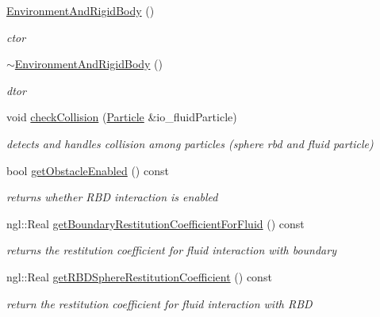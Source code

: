 \begin{DoxyCompactItemize}
\item 
\hyperlink{class_environment_and_rigid_body_adbea7b16726fc80bdaa7cfe528cfe380}{EnvironmentAndRigidBody} ()
\begin{DoxyCompactList}\small\item\em ctor \item\end{DoxyCompactList}\item 
\hyperlink{class_environment_and_rigid_body_afab15b296ce8014225d98c0504d443ce}{$\sim$EnvironmentAndRigidBody} ()
\begin{DoxyCompactList}\small\item\em dtor \item\end{DoxyCompactList}\item 
void \hyperlink{class_environment_and_rigid_body_a5f3b1304b9a7ba38c69367385340e2cb}{checkCollision} (\hyperlink{class_particle}{Particle} \&io\_\-fluidParticle)
\begin{DoxyCompactList}\small\item\em detects and handles collision among particles (sphere rbd and fluid particle) \item\end{DoxyCompactList}\item 
bool \hyperlink{class_environment_and_rigid_body_ad9b64871e62d1cc242683d4bcb785930}{getObstacleEnabled} () const 
\begin{DoxyCompactList}\small\item\em returns whether RBD interaction is enabled \item\end{DoxyCompactList}\item 
ngl::Real \hyperlink{class_environment_and_rigid_body_ad1877fcc8892fd5ddf67169fe81e9c48}{getBoundaryRestitutionCoefficientForFluid} () const 
\begin{DoxyCompactList}\small\item\em returns the restitution coefficient for fluid interaction with boundary \item\end{DoxyCompactList}\item 
ngl::Real \hyperlink{class_environment_and_rigid_body_affe6ded30a2dcaf201668e4754ba9f9b}{getRBDSphereRestitutionCoefficient} () const 
\begin{DoxyCompactList}\small\item\em return the restitution coefficient for fluid interaction with RBD \item\end{DoxyCompactList}\item 

\end{DoxyCompactItemize}
